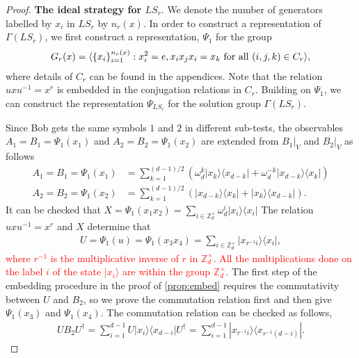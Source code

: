 \documentclass[11pt,letterpaper]{article}
\newcommand{\ket}[1]{|#1\rangle}
\newcommand{\ketbra}[2]{|#1\rangle\langle#2|}
\newcommand{\ct}{^{\dagger}}
\DeclarePairedDelimiter{\ip}{\langle}{\rangle}
\newcommand{\Z}{\mathbb{Z}}
\newcommand{\Zd}{\Z_d^{\times}}
\newcommand{\1}{\mathbb{1}}
\newcommand{\LS}{LS}
\newcommand{\hf}[1]{\textcolor{red}{#1}}
\theoremstyle{definition}
\begin{document}
\begin{proof}
\textbf{The ideal strategy for $\LS_r$}.
We denote the number of generators labelled by $x_i$ in $\LS_r$ by $n_r(x)$.
In order to construct a representation of $\Gamma(\LS_r)$, we first construct a representation, $\Psi_1$ for the group 
\begin{align}
	G_r(x) = \ip{ \{x_i\}_{i=1}^{n_r(x)}: x_i^2 = e, x_i x_j x_i = x_k \text{ for all } (i,j,k) \in C_r},
\end{align}
where details of $C_r$ can be found in the appendices. 
Note that the relation $uxu^{-1} = x^r$ is embedded in the conjugation relations in $C_r$.
Building on $\Psi_1$, we can construct 
the representation $\Psi_{\LS_r}$ for the solution group $\Gamma(\LS_r)$.

Since Bob gets the same symbols $1$ and $2$ in different sub-tests, 
the observables $A_1 = B_1 = \Psi_1(x_1)$ and $A_2 = B_2 = \Psi_1(x_2)$ are extended from $B_1|_V$ and $B_2|_V$ as follows
\begin{align}
	A_1 = B_1 = \Psi_1(x_1) &= \sum_{k=1}^{(d-1)/2}\left( \omega_d^k\ketbra{x_k}{x_{d-k}} + \omega_d^{-k}\ketbra{x_{d-k}}{x_k}\right)\\
	A_2 = B_2 = \Psi_1(x_2) &= \sum_{k=1}^{(d-1)/2}\left(\ketbra{x_{d-k}}{x_k} + \ketbra{x_k}{x_{d-k}}\right).
\end{align}
It can be checked that $X = \Psi_1(x_1x_2) = \sum_{i \in \Zd} \omega_d^i \ketbra{x_i}{x_i}$ 
The relation $uxu^{-1} = x^r$ and $X$ determine that 
\begin{align}
	U =\Psi_1(u) = \Psi_1(x_3x_4) =  \sum_{i \in \Zd} \ketbra{x_{r^{-1}i}}{x_i},
\end{align}
\hf{where $r^{-1}$ is the multiplicative inverse of $r$ in $\Zd$.
All the multiplications done on the label $i$ of the state $\ket{x_i}$ are within the group $\Zd$.}
The first step of the embedding procedure in the proof of \cref{prop:embed} requires
the commutativity between $U$ and $B_2$, so we prove the commutation relation first and
then give $\Psi_1(x_3)$ and $\Psi_1(x_4)$.
The commutation relation can be checked as follows,
\begin{align}
	UB_2U\ct = \sum_{i=1}^{d-1} U\ketbra{x_i}{x_{d-i}}U\ct = \sum_{i=1}^{d-1} \ketbra{x_{r^{-1} i}}{x_{r^{-1}(d-i)}}.

\end{align}
\end{proof}
\end{document}
